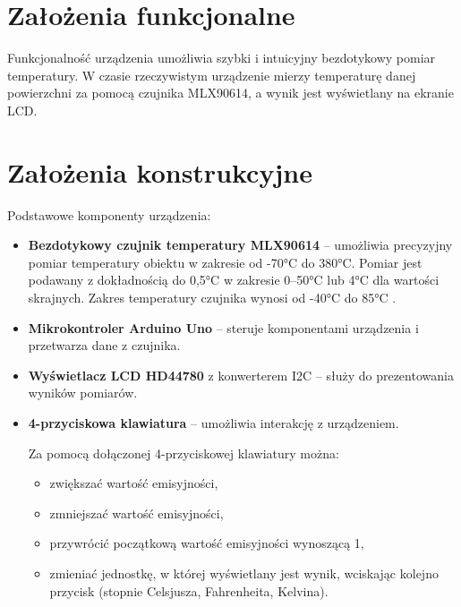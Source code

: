 
\section{Założenia funkcjonalne}

Funkcjonalność urządzenia umożliwia szybki i intuicyjny bezdotykowy pomiar temperatury. W czasie rzeczywistym urządzenie mierzy temperaturę danej powierzchni za pomocą czujnika MLX90614, a wynik jest wyświetlany na ekranie LCD. 

\section{Założenia konstrukcyjne}

Podstawowe komponenty urządzenia:
\begin{itemize}
    \item \textbf{Bezdotykowy czujnik temperatury MLX90614} – umożliwia precyzyjny pomiar temperatury obiektu w zakresie od -70°C do 380°C. Pomiar jest podawany z dokładnością do 0,5°C w zakresie 0–50°C lub 4°C dla wartości skrajnych. Zakres temperatury czujnika wynosi od -40°C do 85°C \cite{4}.
    \item \textbf{Mikrokontroler Arduino Uno} – steruje komponentami urządzenia i przetwarza dane z czujnika.
    \item \textbf{Wyświetlacz LCD HD44780} z konwerterem I2C – służy do prezentowania wyników pomiarów.
    \item \textbf{4-przyciskowa klawiatura} – umożliwia interakcję z urządzeniem.
    
    Za pomocą dołączonej 4-przyciskowej klawiatury można:
\begin{itemize}
    \item zwiększać wartość emisyjności,
    \item zmniejszać wartość emisyjności,
    \item przywrócić początkową wartość emisyjności wynoszącą 1,
    \item zmieniać jednostkę, w której wyświetlany jest wynik, wciskając kolejno przycisk (stopnie Celsjusza, Fahrenheita, Kelvina).
\end{itemize}
\end{itemize}


